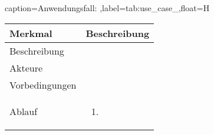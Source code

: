 \begin{dhbwtable}{caption={Anwendungsfall: },label=tab:use_case_,float=H}
    \begin{tabularx}{\textwidth}{lX}
        \toprule
        \textbf{Merkmal} & \textbf{Beschreibung}  \\ \midrule
        Beschreibung    &  \\
        Akteure         &  \\
        Vorbedingungen  &  \\
        Ablauf          & \begin{enumerate}
            \item 
        \end{enumerate} \\\bottomrule
    \end{tabularx}    
\end{dhbwtable}
